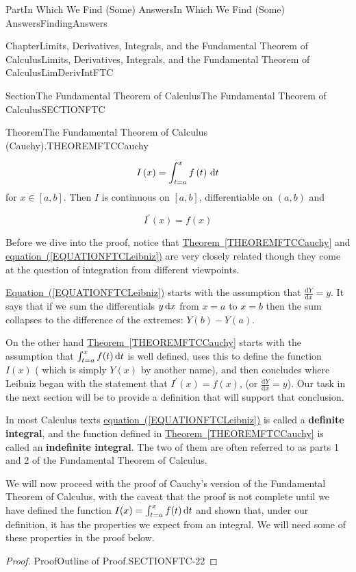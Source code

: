 \documentclass[oneside,10pt,]{book}
\newcommand{\xreffont}{\relax}
\newcommand{\terminology}[1]{\textbf{#1}}
\numberwithin{equation}{part}
\newcommand{\dx}[1]{\,{\rm d}#1}
\newcommand{\dfdx}[2]{\frac{\text{d}{#1}}{\text{d}{#2}}}
\begin{document}
\begin{partptx}{Part}{In Which We Find (Some) Answers}{}{In Which We Find (Some) Answers}{}{}{FindingAnswers}
\begin{chapterptx}{Chapter}{Limits, Derivatives, Integrals, and the Fundamental Theorem of Calculus}{}{Limits, Derivatives, Integrals, and the Fundamental Theorem of Calculus}{}{}{LimDerivIntFTC}
\begin{sectionptx}{Section}{The Fundamental Theorem of Calculus}{}{The Fundamental Theorem of Calculus}{}{}{SECTIONFTC}
\begin{theorem}{Theorem}{The Fundamental Theorem of Calculus (Cauchy).}{}{THEOREMFTCCauchy}
\par
%
\begin{equation*}
I\left(x\right)=\int^x_{t=a}{f\left(t\right)\dx{t}}
\end{equation*}
for \(x\in [a,b]\).  Then \(I\) is continuous on \([a,b]\), differentiable on \((a,b)\) and%
\par
%
\begin{equation*}
I^\prime\left(x\right)=f(x)
\end{equation*}
%
\end{theorem}
Before we dive into the proof, notice that \hyperref[THEOREMFTCCauchy]{Theorem~{\xreffont\ref{THEOREMFTCCauchy}}} and \hyperref[EQUATIONFTCLeibniz]{equation~({\xreffont\ref{EQUATIONFTCLeibniz}})} are very closely related though they come at the question of integration from different viewpoints.%
\par
\hyperref[EQUATIONFTCLeibniz]{Equation~({\xreffont\ref{EQUATIONFTCLeibniz}})} starts with the assumption that \(\dfdx{Y}{x}=y \). It says that if we sum the differentials \(y\dx{x}\) from  \(x=a\) to \(x=b\) then the sum collapses to the difference of the extremes: \(Y(b)-Y(a)\).%
\par
On the other hand \hyperref[THEOREMFTCCauchy]{Theorem~{\xreffont\ref{THEOREMFTCCauchy}}} starts with the assumption that \(\int_{t=a}^x f(t)\dx{t}\) is well defined, uses this to define the function \(I(x)\) ( which is simply \(Y(x)\) by another name), and then concludes where Leibniz began \textemdash{} with the statement that \(I^\prime
(x)=f(x)\), (or \(\dfdx{Y}{x}=y\)). Our task in the next section will be to provide a definition that will support that conclusion.%
\par
In most Calculus texts \hyperref[EQUATIONFTCLeibniz]{equation~({\xreffont\ref{EQUATIONFTCLeibniz}})} is called a \terminology{definite integral}, and the function defined in \hyperref[THEOREMFTCCauchy]{Theorem~{\xreffont\ref{THEOREMFTCCauchy}}} is called an \terminology{indefinite integral}. The two of them are often referred to as parts 1 and 2 of the Fundamental Theorem of Calculus.%
\par
We will now proceed with the proof of Cauchy's version of the Fundamental Theorem of Calculus, with the caveat that the proof is not complete until we have defined the function \(I(x)=\int_{t=a}^x
f(t)\dx{t}\) and shown that, under our definition, it has the properties we expect from an integral. We will need some of these properties in the proof below.%
\begin{proof}{Proof}{Outline of Proof.}{SECTIONFTC-22}

\end{proof}
\end{sectionptx}
\end{chapterptx}
\end{partptx}
\end{document}
